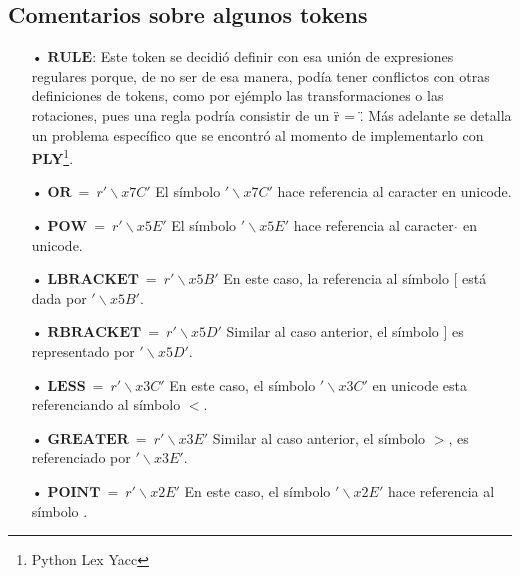 \subsection{Comentarios sobre algunos tokens}
\begin{itemize}
\item[•] $\mathbf{RULE}$: Este token se decidi\'o definir con esa uni\'on de expresiones regulares porque, de no ser de esa manera, pod\'ia tener conflictos con otras definiciones de tokens, como por ej\'emplo las transformaciones o las rotaciones, pues una regla podr\'ia consistir de un \" r = \". M\'as adelante se detalla un problema espec\'ifico que se encontr\'o al momento de implementarlo con \textbf{PLY}\footnote{Python Lex Yacc}. 

\item[•] $\mathbf{OR}\ =\ r'\backslash x7C'$ El s\'imbolo $'\backslash x7C'$ hace referencia al caracter  \textbar   en unicode.
\item[•] $\mathbf{POW}\ =\ r'\backslash x5E'$ El s\'imbolo $'\backslash x5E'$ hace referencia al caracter $ \widehat{} $  en unicode.
\item[•] $\mathbf{LBRACKET}\ =\ r'\backslash x5B'$ En este caso, la referencia al s\'imbolo [ est\'a dada por $'\backslash x5B'$. 
\item[•] $\mathbf{RBRACKET}\ =\ r'\backslash x5D'$ Similar al caso anterior, el s\'imbolo ] es representado por $'\backslash x5D'$.
\item[•] $\mathbf{LESS}\ =\ r'\backslash x3C'$ En este caso, el s\'imbolo $'\backslash x3C'$ en unicode esta referenciando al s\'imbolo $ < $. 
\item[•] $\mathbf{GREATER}\ =\ r'\backslash x3E'$ Similar al caso anterior, el s\'imbolo $ > $, es referenciado por $'\backslash x3E'$.
\item[•] $\mathbf{POINT}\ =\ r'\backslash x2E'$ En este caso, el s\'imbolo $'\backslash x2E'$ hace referencia al s\'imbolo .

\end{itemize}

